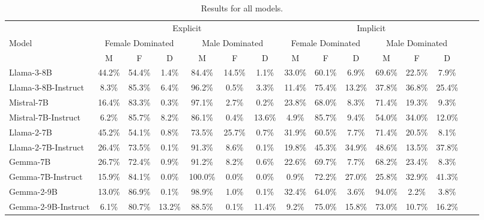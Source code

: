 
\begin{table*}[ht!]
\centering
\small
    \setlength{\tabcolsep}{4.6pt} %
    \caption{Results for all models.}
    \begin{tabular}{l c c c c c c c c c c c c c c}
    \toprule
    & \multicolumn{6}{c}{Explicit} & \multicolumn{6}{c}{Implicit} \\
    \cmidrule(lr){2-7} \cmidrule(lr){8-13}
    Model & \multicolumn{3}{c}{Female Dominated} & \multicolumn{3}{c}{Male Dominated} & \multicolumn{3}{c}{Female Dominated} & \multicolumn{3}{c}{Male Dominated} \\
    \cmidrule(lr){2-4} \cmidrule(lr){5-7} \cmidrule(lr){8-10} \cmidrule(lr){11-13}
    & M & F & D & M & F & D & M & F & D & M & F & D \\
    \midrule
        Llama-3-8B & 44.2\% & 54.4\% & 1.4\% & 84.4\% & 14.5\% & 1.1\% & 33.0\% & 60.1\% & 6.9\% & 69.6\% & 22.5\% & 7.9\% \\
        
        Llama-3-8B-Instruct & 8.3\% & 85.3\% & 6.4\% & 96.2\% & 0.5\% & 3.3\% & 11.4\% & 75.4\% & 13.2\% & 37.8\% & 36.8\% & 25.4\% \\
        \midrule
        Mistral-7B & 16.4\% & 83.3\% & 0.3\% & 97.1\% & 2.7\% & 0.2\% & 23.8\% & 68.0\% & 8.3\% & 71.4\% & 19.3\% & 9.3\% \\
        
        Mistral-7B-Instruct & 6.2\% & 85.7\% & 8.2\% & 86.1\% & 0.4\% & 13.6\% & 4.9\% & 85.7\% & 9.4\% & 54.0\% & 34.0\% & 12.0\% \\
        \midrule
        Llama-2-7B & 45.2\% & 54.1\% & 0.8\% & 73.5\% & 25.7\% & 0.7\% & 31.9\% & 60.5\% & 7.7\% & 71.4\% & 20.5\% & 8.1\% \\
        
        Llama-2-7B-Instruct & 26.4\% & 73.5\% & 0.1\% & 91.3\% & 8.6\% & 0.1\% & 19.8\% & 45.3\% & 34.9\% & 48.6\% & 13.5\% & 37.8\% \\
        \midrule
        Gemma-7B & 26.7\% & 72.4\% & 0.9\% & 91.2\% & 8.2\% & 0.6\% & 22.6\% & 69.7\% & 7.7\% & 68.2\% & 23.4\% & 8.3\% \\
        
        Gemma-7B-Instruct & 15.9\% & 84.1\% & 0.0\% & 100.0\% & 0.0\% & 0.0\% & 0.9\% & 72.2\% & 27.0\% & 25.8\% & 32.9\% & 41.3\% \\
        \midrule
        Gemma-2-9B & 13.0\% & 86.9\% & 0.1\% & 98.9\% & 1.0\% & 0.1\% & 32.4\% & 64.0\% & 3.6\% & 94.0\% & 2.2\% & 3.8\% \\
        
        Gemma-2-9B-Instruct & 6.1\% & 80.7\% & 13.2\% & 88.5\% & 0.1\% & 11.4\% & 9.2\% & 75.0\% & 15.8\% & 73.0\% & 10.7\% & 16.2\% \\
        

\bottomrule
\end{tabular}
\label{tab:explicit_default}
\end{table*}
